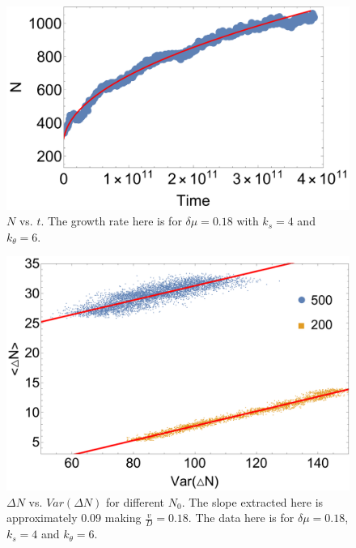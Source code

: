 \documentclass[amsmath,preprintnumbers,10pt,nofootinbib,prl,twocolumn]{revtex4-1}
\begin{document}
\begin{figure}
\centering
\includegraphics[scale=0.5]{longtrajectoryFig2.pdf}
\caption{$N$ vs. $t$. The growth rate here is for $\delta \mu = 0.18$ with $k_s=4$ and $k_\theta = 6$.} \label{fig:GrowthRate}
\end{figure}
\begin{figure}
\centering
\includegraphics[scale=0.4]{deltaNvsVarFig3.pdf}
\caption{$\Delta N$ vs. $Var(\Delta N)$ for different $N_0$. The slope extracted here is approximately 0.09 making $\frac{v}{D}=0.18$. The data here is for $\delta\mu=0.18$, $k_s=4$ and $k_\theta = 6$.} \label{fig:growthvsvariance}
\end{figure}
\end{document}

